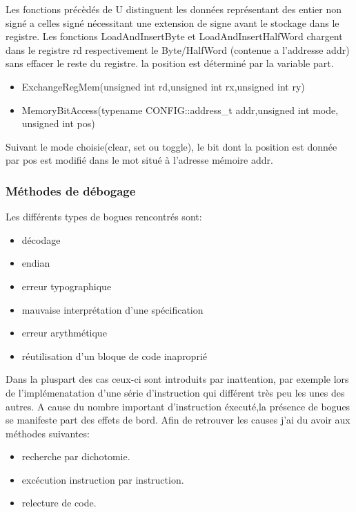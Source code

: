 Les fonctions précèdés de U distinguent les données représentant des entier non signé a celles signé nécessitant une extension de signe avant le stockage dans
le registre.
Les fonctions LoadAndInsertByte et LoadAndInsertHalfWord chargent dans le registre rd respectivement le Byte/HalfWord (contenue a l'addresse addr) sans effacer le reste du registre.
la position est déterminé par la variable part.

\begin{itemize}
\item ExchangeRegMem(unsigned int rd,unsigned int rx,unsigned int ry)
\end{itemize}

\begin{itemize}
\item MemoryBitAccess(typename CONFIG::address\_t addr,unsigned int mode, unsigned int pos)
\end{itemize}
Suivant le mode choisie(clear, set ou toggle), le bit dont la position est donnée par pos est modifié dans le mot situé à l'adresse mémoire addr.

\subsubsection{Méthodes de débogage}

Les différents types de bogues rencontrés sont:
\begin{itemize}
\item décodage
\item endian
\item erreur typographique
\item mauvaise interprétation d'une spécification
\item erreur arythmétique
\item réutilisation d'un bloque de code inaproprié
\end{itemize}

Dans la pluspart des cas ceux-ci sont introduits par inattention, par exemple lors de l'implémenatation d'une série d'instruction qui différent très peu les unes 
des autres. A cause du nombre important d'instruction éxecuté,la présence de bogues se manifeste part des effets de bord. Afin de retrouver les causes j'ai du avoir aux méthodes suivantes:

\begin{itemize}
\item recherche par dichotomie.
\item excécution instruction par instruction. 
\item relecture de code.
\end{itemize}

